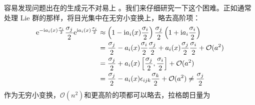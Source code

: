 容易发现问题出在\sutw 的生成元不对易上%
%
。我们来仔细研究一下这个困难。正如通常处理 Lie 群的那样，将目光集中在无穷小变换上，略去高阶项：
\begin{equation}
\begin{aligned}
\mathrm e^{-\mathrm i a_i(x)\frac{\sigma_i}{2}}\frac{\sigma_j}{2}\mathrm e^{\mathrm i a_i(x)\frac{\sigma_i}{2}} & \approx \left(1-\mathrm i a_i(x)\frac{\sigma_i}{2}\right)\frac{\sigma_j}{2}\left(1+\mathrm i a_i\frac{\sigma_i}{2}\right)\\
& = \frac{\sigma_j}{2}-a_i(x)\frac{\sigma_i}{2}\frac{\sigma_j}{2}+a_i(x)\frac{\sigma_j}{2}\frac{\sigma_i}{2}+{\mathcal O}(a^2)\\
& = \frac{\sigma_j}{2}+a_i(x)\left[\frac{\sigma_j}{2},\frac{\sigma_i}{2}\right]+{\mathcal O}(a^2)\\
& = \frac{\sigma_j}{2}-a_i(x)\epsilon_{ijk}\frac{\sigma_k}{2}+{\mathcal O}(a^2)\ne\frac{\sigma_j}{2} \label{equ7.51}
\end{aligned}
\end{equation}
作为无穷小变换，${\mathcal O}(n^2)$和更高阶的项都可以略去，拉格朗日量为
